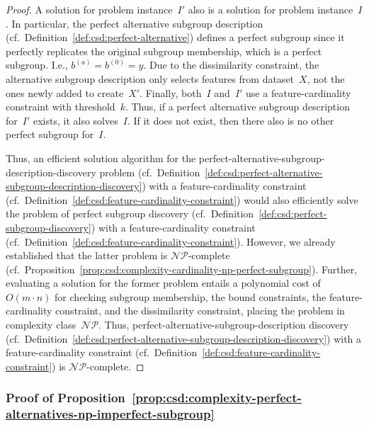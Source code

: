 \documentclass{article}
\theoremstyle{definition}
\begin{document}
\begin{proof}
A solution for problem instance~$I'$ also is a solution for problem instance~$I$.
In particular, the perfect alternative subgroup description (cf.~Definition~\ref{def:csd:perfect-alternative}) defines a perfect subgroup since it perfectly replicates the original subgroup membership, which is a perfect subgroup.
I.e., $b^{(a)} = b^{(0)} = y$.
Due to the dissimilarity constraint, the alternative subgroup description only selects features from dataset~$X$, not the ones newly added to create~$X'$.
Finally, both~$I$ and~$I'$ use a feature-cardinality constraint with threshold~$k$.
Thus, if a perfect alternative subgroup description for~$I'$ exists, it also solves~$I$.
If it does not exist, then there also is no other perfect subgroup for~$I$.

Thus, an efficient solution algorithm for the perfect-alternative-subgroup-description-discovery problem (cf.~Definition~\ref{def:csd:perfect-alternative-subgroup-description-discovery}) with a feature-cardinality constraint (cf.~Definition~\ref{def:csd:feature-cardinality-constraint}) would also efficiently solve the problem of perfect subgroup discovery (cf.~Definition~\ref{def:csd:perfect-subgroup-discovery}) with a feature-cardinality constraint (cf.~Definition~\ref{def:csd:feature-cardinality-constraint}).
However, we already established that the latter problem is $\mathcal{NP}$-complete (cf.~Proposition~\ref{prop:csd:complexity-cardinality-np-perfect-subgroup}).
Further, evaluating a solution for the former problem entails a polynomial cost of $O(m \cdot n)$ for checking subgroup membership, the bound constraints, the feature-cardinality constraint, and the dissimilarity constraint, placing the problem in complexity class~$\mathcal{NP}$.
Thus, perfect-alternative-subgroup-description discovery (cf.~Definition~\ref{def:csd:perfect-alternative-subgroup-description-discovery}) with a feature-cardinality constraint (cf.~Definition~\ref{def:csd:feature-cardinality-constraint}) is $\mathcal{NP}$-complete.
\end{proof}

\subsubsection{Proof of Proposition~\ref{prop:csd:complexity-perfect-alternatives-np-imperfect-subgroup}}
\label{sec:csd:appendix:proofs:complexity-perfect-alternatives-np-imperfect-subgroup}
\end{document}
